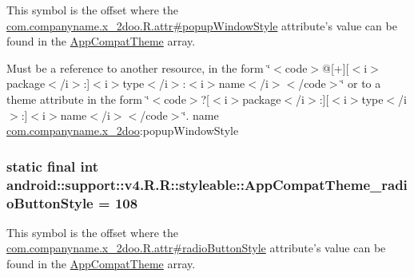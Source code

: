 This symbol is the offset where the \hyperlink{classcom_1_1companyname_1_1x__2doo_1_1_r_1_1attr_f03bd7e649c2bce0a4a14b45011cefa6}{com.companyname.x\_\-2doo.R.attr\#popupWindowStyle} attribute's value can be found in the \hyperlink{classandroid_1_1support_1_1v4_1_1_r_1_1styleable_0873e92ba21076bb5a4aeadeb7f5779f}{AppCompatTheme} array.

Must be a reference to another resource, in the form \char`\"{}$<$code$>$@\mbox{[}+\mbox{]}\mbox{[}$<$i$>$package$<$/i$>$:\mbox{]}$<$i$>$type$<$/i$>$:$<$i$>$name$<$/i$>$$<$/code$>$\char`\"{} or to a theme attribute in the form \char`\"{}$<$code$>$?\mbox{[}$<$i$>$package$<$/i$>$:\mbox{]}\mbox{[}$<$i$>$type$<$/i$>$:\mbox{]}$<$i$>$name$<$/i$>$$<$/code$>$\char`\"{}.  name \hyperlink{namespacecom_1_1companyname_1_1x__2doo}{com.companyname.x\_\-2doo}:popupWindowStyle \hypertarget{classandroid_1_1support_1_1v4_1_1_r_1_1styleable_530d6e3b48153addedc781558453a828}{
\subsubsection[{AppCompatTheme\_\-radioButtonStyle}]{\setlength{\rightskip}{0pt plus 5cm}static final int android::support::v4.R.R::styleable::AppCompatTheme\_\-radioButtonStyle = 108}}
\label{classandroid_1_1support_1_1v4_1_1_r_1_1styleable_530d6e3b48153addedc781558453a828}


This symbol is the offset where the \hyperlink{classcom_1_1companyname_1_1x__2doo_1_1_r_1_1attr_fa8d45cd978def1e56fbbb4b1abb5333}{com.companyname.x\_\-2doo.R.attr\#radioButtonStyle} attribute's value can be found in the \hyperlink{classandroid_1_1support_1_1v4_1_1_r_1_1styleable_0873e92ba21076bb5a4aeadeb7f5779f}{AppCompatTheme} array.

